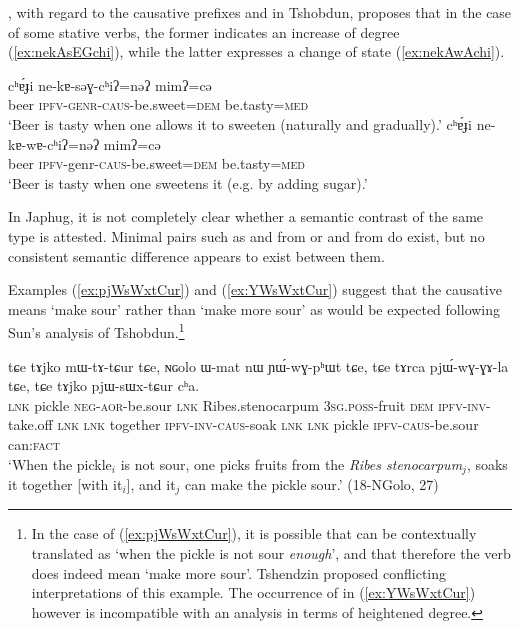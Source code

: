 \citet{jackson06paisheng, jackson14morpho}, with regard to the causative prefixes  and  in Tshobdun, proposes that in the case of some stative verbs, the former indicates an increase of degree (\ref{ex:nekAsEGchi}), while the latter expresses a change of state (\ref{ex:nekAwAchi}). 

\begin{exe}
\ex 
\begin{xlist}
\ex \label{ex:nekAsEGchi}
\gll cʰɐ́ɟi ne-kɐ-səɣ-cʰiʔ=nəʔ mimʔ=cə \\
beer \textsc{ipfv}-\textsc{genr}-\textsc{caus}-be.sweet=\textsc{dem} be.tasty=\textsc{med} \\
\glt ‘Beer is tasty when one allows it to sweeten (naturally and gradually).’
\ex \label{ex:nekAwAchi}
\gll cʰɐ́ɟi ne-kɐ-wɐ-cʰiʔ=nəʔ mimʔ=cə \\
beer \textsc{ipfv}-genr-\textsc{caus}-be.sweet=\textsc{dem} be.tasty=\textsc{med} \\
\glt ‘Beer is tasty when one sweetens it (e.g. by adding sugar).’
\end{xlist}
\end{exe}

In Japhug, it is not completely clear whether a semantic contrast of the same type is attested. Minimal pairs such as  and  from  or  and  from  do exist, but no consistent semantic difference appears to exist between them.

Examples (\ref{ex:pjWsWxtCur}) and (\ref{ex:YWsWxtCur}) suggest that the causative   means `make sour' rather than `make more sour' as would be expected following Sun's analysis of Tshobdun.\footnote{In the case of (\ref{ex:pjWsWxtCur}), it is possible that  can be contextually translated as `when the pickle is not sour \textit{enough}', and that therefore the verb  does indeed mean `make more sour'. Tshendzin proposed conflicting interpretations of this example. The occurrence of  in (\ref{ex:YWsWxtCur}) however is incompatible with an analysis in terms of heightened degree. } 

 \begin{exe}
\ex \label{ex:pjWsWxtCur}
\gll tɕe tɤjko mɯ-tɤ-tɕur tɕe, ɴɢolo ɯ-mat nɯ ɲɯ́-wɣ-pʰɯt tɕe, tɕe tɤrca pjɯ́-wɣ-ɣɤ-la tɕe, tɕe tɤjko pjɯ-sɯx-tɕur cʰa. \\
\textsc{lnk} pickle \textsc{neg}-\textsc{aor}-be.sour \textsc{lnk}  Ribes.stenocarpum \textsc{3sg}.\textsc{poss}-fruit \textsc{dem} \textsc{ipfv}-\textsc{inv}-take.off \textsc{lnk} \textsc{lnk}  together \textsc{ipfv}-\textsc{inv}-\textsc{caus}-soak \textsc{lnk} \textsc{lnk} pickle \textsc{ipfv}-\textsc{caus}-be.sour can:\textsc{fact} \\
\glt `When the pickle$_i$ is not sour, one picks fruits from the \textit{Ribes stenocarpum}$_j$, soaks it together [with it$_i$], and it$_j$ can make the pickle sour.' (18-NGolo, 27)
\end{exe}


